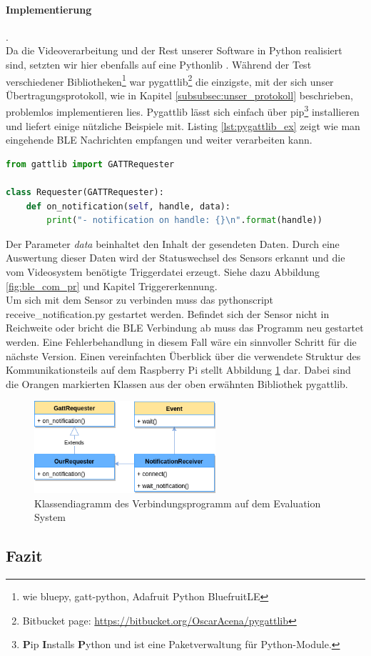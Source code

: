 \paragraph{Implementierung}. \\
Da die Videoverarbeitung und der Rest unserer Software in Python realisiert sind, setzten wir hier ebenfalls auf eine Pythonlib . Während der Test verschiedener Bibliotheken\footnote{wie bluepy, gatt-python, Adafruit Python BluefruitLE} war pygattlib\footnote{Bitbucket page: \url{https://bitbucket.org/OscarAcena/pygattlib}} die einzigste, mit der sich unser Übertragungsprotokoll, wie in Kapitel \ref{subsubsec:unser_protokoll} beschrieben, problemlos implementieren lies. Pygattlib lässt sich einfach über pip\footnote{ \textbf{P}ip \textbf{I}nstalls \textbf{P}ython und ist eine Paketverwaltung für Python-Module. } installieren und liefert einige nützliche Beispiele mit. Listing \ref{lst:pygattlib_ex} zeigt wie man eingehende BLE Nachrichten empfangen und weiter verarbeiten kann. 

\begin{lstlisting}[language=Python, caption=pygattlib: Receive notifications example, label=lst:pygattlib_ex]
  from gattlib import GATTRequester

class Requester(GATTRequester):
    def on_notification(self, handle, data):
        print("- notification on handle: {}\n".format(handle))
\end{lstlisting}

Der Parameter \textit{data} beinhaltet den Inhalt der gesendeten Daten. Durch eine Auswertung dieser Daten wird der Statuswechsel des Sensors erkannt und die vom Videosystem benötigte Triggerdatei erzeugt. Siehe dazu Abbildung \ref{fig:ble_com_pr} und Kapitel  Triggererkennung. \\

Um sich mit dem Sensor zu verbinden muss das pythonscript receive\_notification.py gestartet werden. Befindet sich der Sensor nicht in Reichweite oder bricht die BLE Verbindung ab muss das Programm neu gestartet werden. Eine Fehlerbehandlung in diesem Fall wäre ein sinnvoller Schritt für die nächste Version. Einen vereinfachten Überblick über die verwendete Struktur des Kommunikationsteils auf dem Raspberry Pi stellt Abbildung \ref{fig:classdiagram_connection} dar. Dabei sind die Orangen markierten Klassen aus der oben erwähnten Bibliothek pygattlib.

\begin{figure}[h]
  \centering
  \includegraphics[width=0.6\textwidth]{includes/kom/graphics/gatt_classDiagram2}
  \caption{Klassendiagramm des Verbindungsprogramm auf dem Evaluation System}
  \label{fig:classdiagram_connection}
\end{figure}


\subsection{Fazit}
